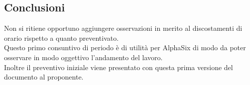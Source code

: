 	\subsection{Conclusioni}
	Non si ritiene opportuno aggiungere osservazioni in merito al discostamenti di orario rispetto a quanto preventivato.\\
	Questo primo consuntivo di periodo è di utilità per AlphaSix di modo da poter osservare in modo oggettivo l'andamento del lavoro.\\
	Inoltre il preventivo iniziale viene presentato con questa prima versione del documento al proponente.
	